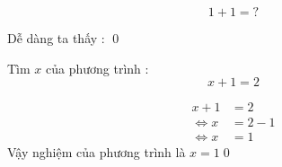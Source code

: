 


\onehalfspacing %






\begin{question}{1}
\[1 + 1 = ?\]
\end{question}

\begin{solution}
Dễ dàng ta thấy :  \qed
\end{solution}

\begin{question}{2}
Tìm $x$ của phương trình : \[x + 1 = 2\]
\end{question}

\begin{solution}
\begin{alignat*}{2}
    x + 1 &= 2 \\
    \Leftrightarrow x &= 2 - 1 \\
    \Leftrightarrow x &= 1
\end{alignat*}
Vậy nghiệm của phương trình là $x = 1$\qed
\end{solution}

